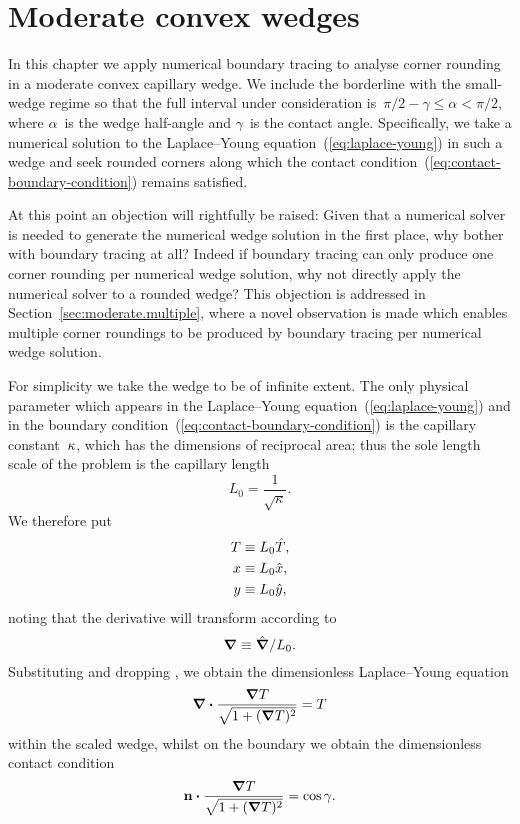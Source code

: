 \chapter{Moderate convex wedges}
\label{ch:moderate}

In this chapter
we apply numerical boundary tracing to analyse corner rounding
in a moderate convex capillary wedge.
We include the borderline with the small-wedge regime
so that the full interval under consideration
is~$\pi/2 - \gamma \le \alpha < \pi/2$,
where $\alpha$~is the wedge half-angle
and $\gamma$~is the contact angle.
Specifically, we take a numerical solution
to the Laplace--Young equation~(\ref{eq:laplace-young}) in such a wedge
and seek rounded corners along which
the contact condition~(\ref{eq:contact-boundary-condition})
remains satisfied.

At this point an objection will rightfully be raised:
Given that a numerical solver is needed
to generate the numerical wedge solution in the first place,
why bother with boundary tracing at all?
Indeed if boundary tracing can only produce
one corner rounding per numerical wedge solution,
why not directly apply the numerical solver to a rounded wedge?
This objection is addressed
in Section~\ref{sec:moderate.multiple},
where a novel observation is made
which enables multiple corner roundings to be produced by boundary tracing
per numerical wedge solution.

\thematicbreak

For simplicity we take the wedge to be of infinite extent.
The only physical parameter which appears
in the Laplace--Young equation~(\ref{eq:laplace-young})
and in the boundary condition~(\ref{eq:contact-boundary-condition})
is the capillary constant~$\kappa$,
which has the dimensions of reciprocal area;
thus the sole length scale of the problem
is the capillary length
\begin{equation}
  L_0 = \frac{1}{\sqrt{\kappa}}.
  \label{eq:capillary-length}
\end{equation}
We therefore put
\begin{align}
  T &\equiv L_0 \hat{T}, \label{eq:capillary-height-scaling} \\
  x &\equiv L_0 \hat{x}, \label{eq:capillary-x-scaling} \\
  y &\equiv L_0 \hat{y}, \label{eq:capillary-y-scaling}
\end{align}
noting that the derivative will transform according to
\begin{equation}
  \mathop{}\!\boldsymbol{\mathbf{\nabla}} \equiv \mathop{}\!\hat{\mathop{}\!\boldsymbol{\mathbf{\nabla}}} / L_0.
  \label{eq:capillary-del-scaling}
\end{equation}
Substituting and dropping \scalingmarks,
we obtain the dimensionless Laplace--Young equation
\begin{equation}
  \mathop{}\!\boldsymbol{\mathbf{\nabla}} \boldsymbol{\cdot} \frac{\mathop{}\!\boldsymbol{\mathbf{\nabla}} T}{\sqrt{1 + (\mathop{}\!\boldsymbol{\mathbf{\nabla}} T)^2}} =  T
  \label{eq:scaled-laplace-young}
\end{equation}
within the scaled wedge,
whilst on the boundary we obtain the dimensionless contact condition
\begin{equation}
  \mathop{}\!\boldsymbol{\mathbf{n}} \boldsymbol{\cdot} \frac{\mathop{}\!\boldsymbol{\mathbf{\nabla}} T}{\sqrt{1 + (\mathop{}\!\boldsymbol{\mathbf{\nabla}} T)^2}} = \cos\gamma.
  \label{eq:scaled-contact-boundary-condition}
\end{equation}

